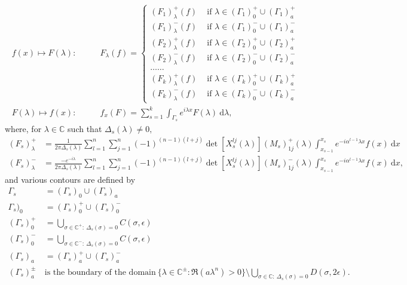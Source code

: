 \documentclass[11pt,reqno,oneside,a4paper]{article}
\theoremstyle{plain} %
\theoremstyle{definition}
\theoremstyle{remark}
\begin{document}
\begin{align*}
f(x) \mapsto F(\lambda): \qquad &F_{\lambda}(f) = 
\begin{cases} 
(F_1)^+_{\lambda} (f) &\mbox{ if } \lambda \in (\Gamma_1)_0^+ \cup (\Gamma_1)_a^+ \\
(F_1)^-_{\lambda} (f) &\mbox{ if } \lambda \in (\Gamma_1)_0^- \cup (\Gamma_1)_a^- \\
(F_2)^+_{\lambda} (f) &\mbox{ if } \lambda \in (\Gamma_2)_0^+ \cup (\Gamma_2)_a^+ \\
(F_2)^-_{\lambda} (f) &\mbox{ if } \lambda \in (\Gamma_2)_0^- \cup (\Gamma_2)_a^- \\
\ldots \ldots & \\
(F_k)^+_{\lambda} (f) &\mbox{ if } \lambda \in (\Gamma_k)_0^+ \cup (\Gamma_k)_a^+ \\
(F_k)^-_{\lambda} (f) &\mbox{ if } \lambda \in (\Gamma_k)_0^- \cup (\Gamma_k)_a^-
\end{cases}
\\
F(\lambda) \mapsto f(x): \qquad &f_x(F) = \sum^k_{s=1} \int_{\Gamma_s} e^{i\lambda x} F(\lambda) ~\mathrm{d} \lambda,
\end{align*}
where, for $\lambda \in \mathbb{C}$ such that $\Delta_s(\lambda) \neq 0,$
\begin{align*}
(F_s)^+_{\lambda} &= \frac{1}{2 \pi \Delta_s(\lambda)} \sum^n_{l=1} \sum^n_{j=1} (-1)^{(n-1)(l+j)} \det[ X_s^{lj} (\lambda)] (M_s)^+_{1j}(\lambda) \int^{x_s}_{x_{s-1}} e^{- i \alpha^{l-1}\lambda x} f(x) ~\mathrm{d} x \\
(F_s)^-_{\lambda} &= \frac{-e^{-i\lambda}}{2 \pi \Delta_s(\lambda)} \sum^n_{l=1} \sum^n_{j=1} (-1)^{(n-1)(l+j)} \det[ X_s^{lj} (\lambda)] (M_s)^-_{1j}(\lambda) \int^{x_s}_{x_{s-1}} e^{- i \alpha^{l-1}\lambda x} f(x) ~\mathrm{d} x,
\end{align*}
and various contours are defined by 
\begin{align*}
\Gamma_s &= (\Gamma_s)_0 \cup (\Gamma_s)_a \\
\Gamma_s)_0 &= (\Gamma_s)_0^+ \cup (\Gamma_s)_0^- \\
(\Gamma_s)_0^+ &= \bigcup_{ \sigma \in \mathbb{C}^+: ~\Delta_s(\sigma) = 0} C(\sigma, \epsilon) \\
(\Gamma_s)_0^- &= \bigcup_{ \sigma \in \mathbb{C}^-: ~\Delta_s(\sigma) = 0} C(\sigma, \epsilon) \\
(\Gamma_s)_a &= (\Gamma_s)_a^+ \cup (\Gamma_s)_a^- \\
(\Gamma_s)_a^{\pm} ~&\text{is the boundary of the domain}~ \{ \lambda \in \mathbb{C}^{\pm} : \Re (a \lambda^n) > 0 \} \setminus \bigcup_{\sigma \in \mathbb{C}: ~\Delta_s(\sigma) = 0} D(\sigma, 2\epsilon). 
\end{align*}
\end{document}
